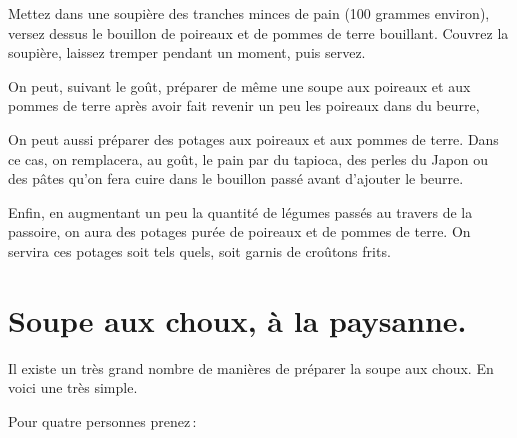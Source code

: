 Mettez dans une soupière des tranches minces de pain (100 grammes environ),
versez dessus le bouillon de poireaux et de pommes de terre bouillant. Couvrez la
soupière, laissez tremper pendant un moment, puis servez.

\sk

On peut, suivant le goût, préparer de même une soupe aux poireaux et aux
pommes de terre après avoir fait revenir un peu les poireaux dans du beurre,

\sk

On peut aussi préparer des potages aux poireaux et aux pommes de terre. Dans
ce cas, on remplacera, au goût, le pain par du tapioca, des perles du Japon ou
des pâtes qu'on fera cuire dans le bouillon passé avant d'ajouter le beurre.

\sk

Enfin, en augmentant un peu la quantité de légumes passés au travers de la
passoire, on aura des potages purée de poireaux et de pommes de terre. On
servira ces potages soit tels quels, soit garnis de croûtons frits.

\section*{\centering Soupe aux choux, à la paysanne.}

Il existe un très grand nombre de manières de préparer la soupe aux choux. En
voici une très simple.

\medskip

Pour quatre personnes prenez :

\medskip

